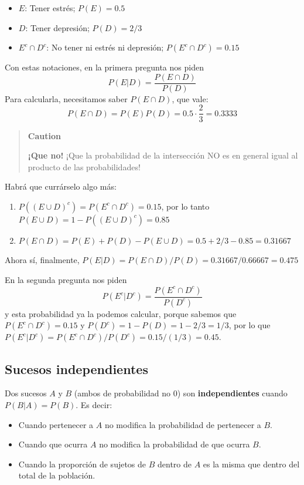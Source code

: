 \documentclass[
  spanish,
  letterpaper,
  DIV=11,
  numbers=noendperiod]{scrreprt}
\providecommand{\tightlist}{%
  \setlength{\itemsep}{0pt}\setlength{\parskip}{0pt}}
\begin{document}
\begin{tcolorbox}
\begin{itemize}
\item
  \(E\): Tener estrés; \(P(E)=0.5\)
\item
  \(D\): Tener depresión; \(P(D)=2/3\)
\item
  \(E^c \cap D^c\): No tener ni estrés ni depresión;
  \(P(E^c\cap D^c)=0.15\)
\end{itemize}

Con estas notaciones, en la primera pregunta nos piden \[
P(E|D)=\dfrac{P(E\cap D)}{P(D)}
\] Para calcularla, necesitamos saber \(P(E\cap D)\), que vale: \[
P(E\cap D)=P(E)P(D)=0.5\cdot \frac{2}{3}=0.3333
\]

\begin{quote}
\textbf{Caution}

\textbf{¡Que no!} ¡Que la probabilidad de la intersección NO es en
general igual al producto de las probabilidades!
\end{quote}

Habrá que currárselo algo más:

\begin{enumerate}
\def\labelenumi{\arabic{enumi}.}
\item
  \(P((E\cup D)^c)=P(E^c\cap D^c)=0.15\), por lo tanto
  \(P(E\cup D)=1-P((E\cup D)^c)=0.85\)
\item
  \(P(E\cap D)=P(E)+P(D)-P(E\cup D)=0.5+2/3-0.85=0.31667\)
\end{enumerate}

Ahora sí, finalmente, \(P(E|D)=P(E\cap D)/P(D)=0.31667/0.66667=0.475\)

En la segunda pregunta nos piden \[
P(E^c|D^c)=\dfrac{P(E^c\cap D^c)}{P(D^c)}
\] y esta probabilidad ya la podemos calcular, porque sabemos que
\(P(E^c\cap D^c)=0.15\) y \(P(D^c)=1-P(D)=1-2/3=1/3\), por lo que
\(P(E^c|D^c)=P(E^c\cap D^c)/P(D^c)=0.15/(1/3)=0.45\).

\subsection{Sucesos independientes}\label{sucesos-independientes}

Dos sucesos \(A\) y \(B\) (ambos de probabilidad no 0) son
\textbf{independientes} cuando \(P(B|A)=P(B)\). Es decir:

\begin{itemize}
\tightlist
\item
  Cuando pertenecer a \(A\) no modifica la probabilidad de pertenecer a
  \(B\).
\item
  Cuando que ocurra \(A\) no modifica la probabilidad de que ocurra
  \(B\).
\item
  Cuando la proporción de sujetos de \(B\) dentro de \(A\) es la misma
  que dentro del total de la población.
\end{itemize}


\end{tcolorbox}
\end{document}
